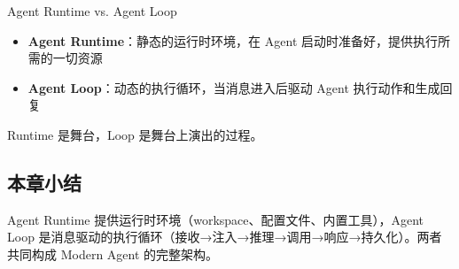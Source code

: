 \begin{knowledgebox}{Agent Runtime vs. Agent Loop}
\begin{itemize}
    \item \textbf{Agent Runtime}：静态的运行时环境，在 Agent 启动时准备好，提供执行所需的一切资源
    \item \textbf{Agent Loop}：动态的执行循环，当消息进入后驱动 Agent 执行动作和生成回复
\end{itemize}
Runtime 是舞台，Loop 是舞台上演出的过程。
\end{knowledgebox}

\subsection{本章小结}

Agent Runtime 提供运行时环境（workspace、配置文件、内置工具），Agent Loop 是消息驱动的执行循环（接收→注入→推理→调用→响应→持久化）。两者共同构成 Modern Agent 的完整架构。


